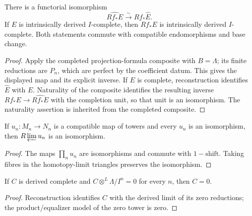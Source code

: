 \begin{lemma}
\label{lemma:weil-pbc-direct-image-derived-completion}
\uses{}

There is a functorial isomorphism
\[
 \widehat{Rf_*E}\xrightarrow{\sim}Rf_*\widehat E.
\]
If $E$ is intrinsically derived $I$-complete, then $Rf_*E$ is intrinsically
derived $I$-complete.  Both statements commute with compatible endomorphisms
and base change.
\end{lemma}
\begin{proof}

Apply the completed projection-formula composite with $B=\Lambda$; its
finite reductions are $P_n$, which are perfect by the coefficient datum.
This gives the displayed map and its explicit inverse.  If $E$ is complete,
reconstruction identifies $\widehat E$ with $E$.  Naturality of the composite
identifies the resulting inverse $Rf_*E\to\widehat{Rf_*E}$ with the
completion unit, so that unit is an isomorphism.  The naturality assertion is
inherited from the completed composite.
\end{proof}

\begin{lemma}
\label{lemma:weil-pbc-r-lim-levelwise-isomorphism}
\uses{}
If $u_n:M_n\to N_n$ is a compatible map of towers and every $u_n$ is an
isomorphism, then $R\varprojlim u_n$ is an isomorphism.
\end{lemma}
\begin{proof}
The maps $\prod_nu_n$ are isomorphisms and commute with
$1-\mathrm{shift}$.  Taking fibres in the homotopy-limit triangles preserves
the isomorphism.
\end{proof}

\begin{lemma}
\label{lemma:weil-pbc-complete-cone-zero}
\uses{}

If $C$ is derived complete and $C\otimes^L\Lambda/I^n=0$ for every $n$, then
$C=0$.
\end{lemma}
\begin{proof}

Reconstruction identifies $C$ with the derived limit of its zero reductions;
the product/equalizer model of the zero tower is zero.
\end{proof}

